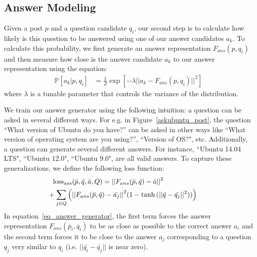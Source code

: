 \documentclass[11pt,a4paper]{article}
\begin{document}
\subsection{Answer Modeling}\label{answer_modeling}

Given a post $p$ and a question candidate $q_i$, our second step is to calculate how likely is this question to be answered using one of our answer candidates $a_k$. To calculate this probability, we first generate an answer representation $F_{ans}(p,q_i)$ and then measure how close is the answer candidate $a_k$ to our answer representation using the equation:
\begin{align}
\mathbb{P}[a_k |p,q_i]  
&= \frac 1 Z \exp\left[- \lambda || a_k  -  F_{ans}(p,q_i) ||^2\right]
\end{align}
where $\lambda$ is a tunable parameter that controls the variance of the distribution. 

We train our answer generator using the following intuition: a question can be asked in several different ways. For e.g. in Figure~\ref{askubuntu_post}, the question ``\textsf{\small What version of Ubuntu do you have?}'' can be asked in other ways like ``\textsf{\small What version of operating system are you using?}'', ``\textsf{\small Version of OS?}", etc.  
Additionally, a question can generate several different answers. For instance, ``\textsf{\small Ubuntu 14.04 LTS}", ``\textsf{\small Ubuntu 12.0}", ``\textsf{\small Ubuntu 9.0}", are all valid answers. To capture these generalizations, we define the following loss function:
\begin{align}\label{eq_answer_generator}
\textrm{loss}_{\textrm{ans}}(\bar p, \bar q, \bar a, Q) 
&=  {|| F_{ans}(\bar p, \bar q) - \bar a||}^2 & \\
&\hspace{-28mm} +  \sum_{j \in Q} \Big ( {|| F_{ans}(\bar p, \bar q) - \bar{a_j} ||}^2  (1 - \tanh{(|| \bar q - \bar{q_j} ||^2)}) \Big ) &\nonumber
\end{align}
%
 In equation~\ref{eq_answer_generator}, the first term forces the answer representation $F_{ans}(\bar p_i, \bar q_i)$ to be as close as possible to the correct answer $a_i$ and the second term forces it to be close to the answer $a_j$ corresponding to a question $q_j$ very similar to $q_i$ (i.e. $||\bar{q_i} - \bar{q_j}||$ is near zero).
\end{document}
